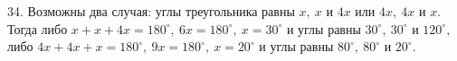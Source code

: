 34. Возможны два случая: углы треугольника равны $x,\ x$ и $4x$ или $4x,\ 4x$ и $x.$ Тогда либо $x+x+4x=180^\circ,\ 6x=180^\circ,\ x=30^\circ$ и углы равны
$30^\circ,\ 30^\circ$  и $120^\circ,$ либо $4x+4x+x=180^\circ,\ 9x=180^\circ,\ x=20^\circ$ и углы равны $80^\circ,\ 80^\circ$ и $20^\circ.$\\
